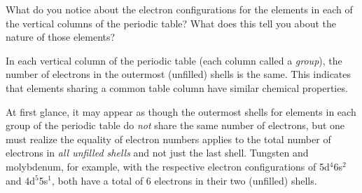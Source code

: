 

What do you notice about the electron configurations for the elements in each of the vertical columns of the periodic table?  What does this tell you about the nature of those elements? 







In each vertical column of the periodic table (each column called a {\it group}), the number of electrons in the outermost (unfilled) shells is the same.  This indicates that elements sharing a common table column have similar chemical properties.

At first glance, it may appear as though the outermost shells for elements in each group of the periodic table do {\it not} share the same number of electrons, but one must realize the equality of electron numbers applies to the total number of electrons in {\it all unfilled shells} and not just the last shell.  Tungsten and molybdenum, for example, with the respective electron configurations of 5d$^{4}$6s$^{2}$ and 4d$^{5}$5s$^{1}$, both have a total of 6 electrons in their two (unfilled) shells.











